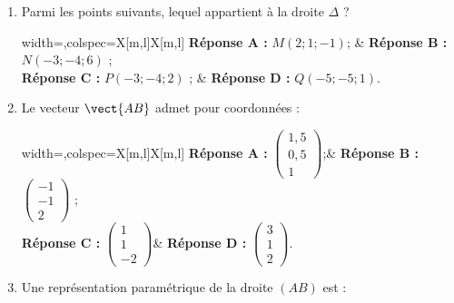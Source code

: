 \begin{enumerate}
	\item Parmi les points suivants, lequel appartient à la droite $\Delta$ ?
	\begin{center}
		\begin{tblr}{width=\linewidth,colspec={X[m,l]X[m,l]}}
			\textbf{Réponse A :} $M(2;1;-1)$; & \textbf{Réponse B :} $N(-3;-4;6)$ ;\\
			\textbf{Réponse C :} $P(-3;-4;2)$ ; & \textbf{Réponse D :} $Q(-5;-5;1)$.
		\end{tblr}
	\end{center}
	
	\item Le vecteur $\vect{AB}$ admet pour coordonnées :
	
	\begin{center}
		\begin{tblr}{width=\linewidth,colspec={X[m,l]X[m,l]}}
			\textbf{Réponse A :} $\begin{pmatrix}1,5\\0,5\\1\end{pmatrix}$;& \textbf{Réponse B :}$\begin{pmatrix}-1\\-1\\2\end{pmatrix}$ ;\\
			\textbf{Réponse C :} $\begin{pmatrix}1\\1\\-2\end{pmatrix}$& \textbf{Réponse D :} $\begin{pmatrix}3\\1\\2\end{pmatrix}$.
		\end{tblr}
	\end{center}
	
	\item Une représentation paramétrique de la droite $(AB)$ est :
	

\end{enumerate}
